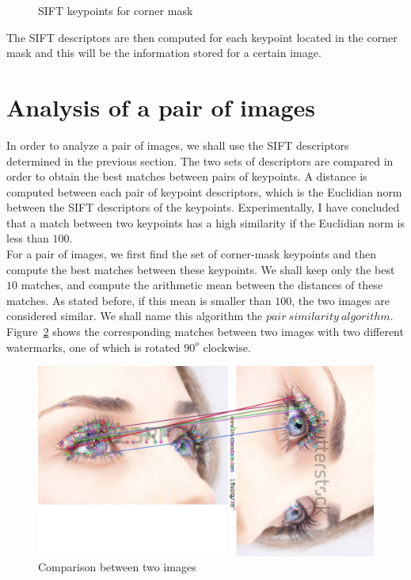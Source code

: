 \begin{figure}[ht!]
\begin{minipage}{.5\textwidth}
	\caption{SIFT keypoints for corner mask}
	\label{fig:messiCornerSift}
\end{minipage}
\end{figure}

The SIFT descriptors are then computed for each keypoint located in the corner mask and this will be the information stored for a certain image.

\section{Analysis of a pair of images}

In order to analyze a pair of images, we shall use the SIFT descriptors determined in the previous section. The two sets of descriptors are compared in order to obtain the best matches between pairs of keypoints. A distance is computed between each pair of keypoint descriptors, which is the Euclidian norm between the SIFT descriptors of the keypoints. Experimentally, I have concluded that a match between two keypoints has a high similarity if the Euclidian norm is less than $100$.\\
For a pair of images, we first find the set of corner-mask keypoints and then compute the best matches between these keypoints. We shall keep only the best $10$ matches, and compute the arithmetic mean between the distances of these matches. As stated before, if this mean is smaller than $100$, the two images are considered similar. We shall name this algorithm the $pair\ similarity\ algorithm$.\\
Figure~\ref{fig:compareImages} shows the corresponding matches between two images with two different watermarks, one of which is rotated $90^o$ clockwise.

\begin{figure}[ht!]
\centering
\includegraphics[width=.8\linewidth]{images/compare.png}
\caption{Comparison between two images}
\label{fig:compareImages}
\end{figure}
 
